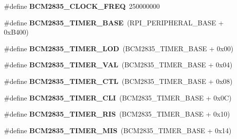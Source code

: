 \begin{DoxyCompactItemize}
\item 
\mbox{\label{group__raspberrypi__reg_ga3f0c04ab6b26602a68cbeac788c9aa96}} 
\#define {\bfseries B\+C\+M2835\+\_\+\+C\+L\+O\+C\+K\+\_\+\+F\+R\+EQ}~250000000
\item 
\mbox{\label{group__raspberrypi__reg_ga219282db00e29e20c283af215ce26d46}} 
\#define {\bfseries B\+C\+M2835\+\_\+\+T\+I\+M\+E\+R\+\_\+\+B\+A\+SE}~(R\+P\+I\+\_\+\+P\+E\+R\+I\+P\+H\+E\+R\+A\+L\+\_\+\+B\+A\+SE + 0x\+B400)
\item 
\mbox{\label{group__raspberrypi__reg_ga6d3b05fe40a666216fa463040c7dcf38}} 
\#define {\bfseries B\+C\+M2835\+\_\+\+T\+I\+M\+E\+R\+\_\+\+L\+OD}~(B\+C\+M2835\+\_\+\+T\+I\+M\+E\+R\+\_\+\+B\+A\+SE + 0x00)
\item 
\mbox{\label{group__raspberrypi__reg_gaec0a200a348e6b15de57559110106aff}} 
\#define {\bfseries B\+C\+M2835\+\_\+\+T\+I\+M\+E\+R\+\_\+\+V\+AL}~(B\+C\+M2835\+\_\+\+T\+I\+M\+E\+R\+\_\+\+B\+A\+SE + 0x04)
\item 
\mbox{\label{group__raspberrypi__reg_ga980ee8fba933207f931c252a0227323f}} 
\#define {\bfseries B\+C\+M2835\+\_\+\+T\+I\+M\+E\+R\+\_\+\+C\+TL}~(B\+C\+M2835\+\_\+\+T\+I\+M\+E\+R\+\_\+\+B\+A\+SE + 0x08)
\item 
\mbox{\label{group__raspberrypi__reg_gaf3e41af45ab35a05e29debf35f2d6de8}} 
\#define {\bfseries B\+C\+M2835\+\_\+\+T\+I\+M\+E\+R\+\_\+\+C\+LI}~(B\+C\+M2835\+\_\+\+T\+I\+M\+E\+R\+\_\+\+B\+A\+SE + 0x0\+C)
\item 
\mbox{\label{group__raspberrypi__reg_ga330a1af7ba651b9b7098433083a4d8f0}} 
\#define {\bfseries B\+C\+M2835\+\_\+\+T\+I\+M\+E\+R\+\_\+\+R\+IS}~(B\+C\+M2835\+\_\+\+T\+I\+M\+E\+R\+\_\+\+B\+A\+SE + 0x10)
\item 
\mbox{\label{group__raspberrypi__reg_ga94e55e698b7832d995d784569330260a}} 
\#define {\bfseries B\+C\+M2835\+\_\+\+T\+I\+M\+E\+R\+\_\+\+M\+IS}~(B\+C\+M2835\+\_\+\+T\+I\+M\+E\+R\+\_\+\+B\+A\+SE + 0x14)
\item 

\end{DoxyCompactItemize}
